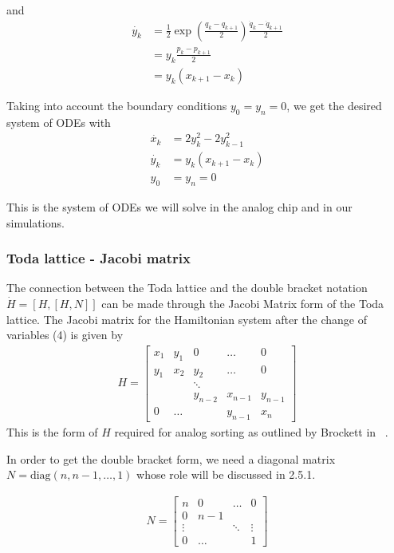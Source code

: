 and 
\begin{align*}
    \dot{y_k} &= \frac{1}{2}\exp(\frac{q_k-q_{k+1}}{2})\frac{\dot q_k-\dot q_{k+1}}{2} \\
              &= y_k\frac{p_k-p_{k+1}}{2} \\
              &= y_k(x_{k+1}-x_k) 
\end{align*}

Taking into account the boundary conditions $y_0=y_n=0$, we get the desired system of ODEs with
\begin{align}
    \dot{x_k} &= 2y^2_k-2y^2_{k-1} \nonumber \\
    \dot{y_k} &= y_k(x_{k+1}-x_k) \\
    y_0 &= y_n = 0 \nonumber
\end{align}

This is the system of ODEs we will solve in the analog chip and in our simulations.


\subsubsection{Toda lattice - Jacobi matrix}

The connection between the Toda lattice and the double bracket notation $\dot{H} = [H,[H,N]]$ can be made through the Jacobi Matrix form of the Toda lattice. The Jacobi matrix for the Hamiltonian system after the change of variables (4) is given by
\begin{align}
 H = \begin{bmatrix}
    x_{1} & y_{1} & 0  & \dots & 0 \\
    y_{1} & x_{2} & y_{2} & \dots & 0 \\
     & & \ddots & \\
          &       & y_{n-2} & x_{n-1} & y_{n-1}\\
    0 & \hdots & & y_{n-1} & x_{n}
\end{bmatrix}
\end{align}
This is the form of $H$ required for analog sorting as outlined by Brockett in ~\cite{brockett}.

In order to get the double bracket form, we need a diagonal matrix $N = \text{diag}(n, n-1, \dots, 1)$ whose role will be discussed in 2.5.1.

\begin{align*}
N = \begin{bmatrix}
        n & 0 & \hdots & 0 \\
        0 & n-1 & \\
        \vdots &  & \ddots & \vdots \\
        0 & \hdots & & 1
    \end{bmatrix}
\end{align*}

